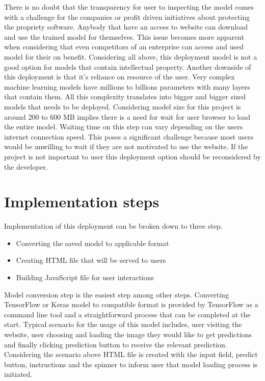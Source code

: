 There is no doubt that the transparency for user to inspecting the model comes with a challenge for the companies or profit driven initiatives about protecting the propriety software.
Anybody that have an access to website can download and use the trained model for themselves.
This issue becomes more apparent when considering that even competitors of an enterprise can access and used model for their on benefit.
Considering all above, this deployment model is not a good option for models that contain intellectual property.
Another downside of this deployment is that it's reliance on resource of the user.
Very complex machine learning models have millions to billions parameters with many layers that contain them.
All this complexity translates into bigger and bigger sized models that needs to be deployed. 
Considering model size for this project is around 200 to 600 MB
implies there is a need for wait for user browser to load the entire model.
Waiting time on this step can vary depending on the users internet connection speed.
This poses a significant challenge because most users would be unwilling to wait if they are not motivated to use the website.
If the project is not important to user this deployment option should be reconsidered by the developer.

\section{Implementation steps}
Implementation of this deployment can be broken down to three step.

\begin{itemize}
    \item Converting the saved model to applicable format 
    \item Creating HTML file that will be served to users 
    \item Building JavaScript file for user interactions
\end{itemize}

Model conversion step is the easiest step among other steps.
Converting TensorFlow or Keras model to compatible format is provided by TensorFlow as a command line tool and a straightforward process that can be completed at the start.
Typical scenario for the usage of this model includes, user visiting the website, user choosing and loading the image they would like to get predictions and finally clicking prediction button to receive the relevant prediction.
Considering the scenario above HTML file is created with the input field, predict button, instructions and the spinner to inform user that model loading process is initiated.

